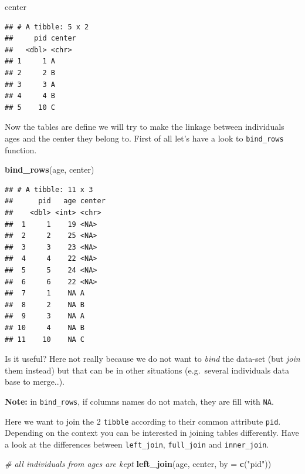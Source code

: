 \documentclass[
]{book}
\newenvironment{Shaded}{\begin{snugshade}}{\end{snugshade}}
\newcommand{\AttributeTok}[1]{\textcolor[rgb]{0.13,0.29,0.53}{#1}}
\newcommand{\CommentTok}[1]{\textcolor[rgb]{0.56,0.35,0.01}{\textit{#1}}}
\newcommand{\FunctionTok}[1]{\textcolor[rgb]{0.13,0.29,0.53}{\textbf{#1}}}
\newcommand{\NormalTok}[1]{#1}
\newcommand{\StringTok}[1]{\textcolor[rgb]{0.31,0.60,0.02}{#1}}
\begin{document}
\begin{Shaded}
\begin{Highlighting}[]
\NormalTok{center}
\end{Highlighting}
\end{Shaded}

\begin{verbatim}
## # A tibble: 5 x 2
##     pid center
##   <dbl> <chr> 
## 1     1 A     
## 2     2 B     
## 3     3 A     
## 4     4 B     
## 5    10 C
\end{verbatim}

Now the tables are define we will try to make the linkage between individuals ages and the center
they belong to.
First of all let's have a look to \texttt{bind\_rows} function.

\begin{Shaded}
\begin{Highlighting}[]
\FunctionTok{bind\_rows}\NormalTok{(age, center)}
\end{Highlighting}
\end{Shaded}

\begin{verbatim}
## # A tibble: 11 x 3
##      pid   age center
##    <dbl> <int> <chr> 
##  1     1    19 <NA>  
##  2     2    25 <NA>  
##  3     3    23 <NA>  
##  4     4    22 <NA>  
##  5     5    24 <NA>  
##  6     6    22 <NA>  
##  7     1    NA A     
##  8     2    NA B     
##  9     3    NA A     
## 10     4    NA B     
## 11    10    NA C
\end{verbatim}

Is it useful?
Here not really because we do not want to \emph{bind} the data-set (but \emph{join} them instead) but that can be in other situations (e.g.~several individuals data base to merge..).

\textbf{Note:} in \texttt{bind\_rows}, if columns names do not match, they are fill with \texttt{NA}.

Here we want to join the 2 \texttt{tibble} according to their common attribute \texttt{pid}. Depending
on the context you can be interested in joining tables differently. Have a look at the differences
between \texttt{left\_join}, \texttt{full\_join} and \texttt{inner\_join}.

\begin{Shaded}
\begin{Highlighting}[]
\CommentTok{\# all individuals from ages are kept}
\FunctionTok{left\_join}\NormalTok{(age, center, }\AttributeTok{by =} \FunctionTok{c}\NormalTok{(}\StringTok{"pid"}\NormalTok{))}
\end{Highlighting}
\end{Shaded}
\end{document}
